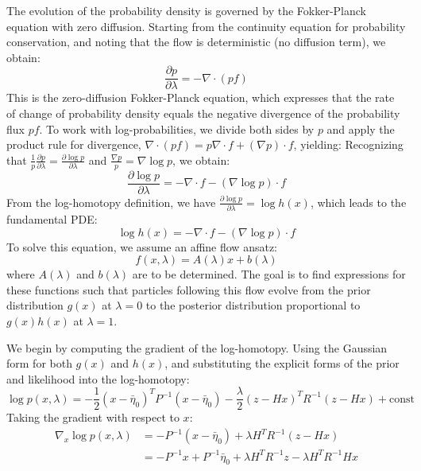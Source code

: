\documentclass{article}
\begin{document}
The evolution of the probability density is governed by the Fokker-Planck equation with zero diffusion. Starting from the continuity equation for probability conservation, and noting that the flow is deterministic (no diffusion term), we obtain:
\begin{equation}
\frac{\partial p}{\partial \lambda} = -\nabla \cdot (pf)
\end{equation}
This is the zero-diffusion Fokker-Planck equation, which expresses that the rate of change of probability density equals the negative divergence of the probability flux $pf$. To work with log-probabilities, we divide both sides by $p$ and apply the product rule for divergence, $\nabla \cdot (pf) = p\nabla \cdot f + (\nabla p) \cdot f$, yielding:
Recognizing that $\frac{1}{p}\frac{\partial p}{\partial \lambda} = \frac{\partial \log p}{\partial \lambda}$ and $\frac{\nabla p}{p} = \nabla \log p$, we obtain:
\begin{equation}
\frac{\partial \log p}{\partial \lambda} = -\nabla \cdot f - (\nabla \log p) \cdot f
\end{equation}
From the log-homotopy definition, we have $\frac{\partial \log p}{\partial \lambda} = \log h(x)$, which leads to the fundamental PDE:
\begin{equation}
\boxed{\log h(x) = -\nabla \cdot f - (\nabla \log p) \cdot f}
\end{equation}
To solve this equation, we assume an affine flow ansatz:
\begin{equation}
f(x,\lambda) = A(\lambda)x + b(\lambda)
\end{equation}
where $A(\lambda)$ and $b(\lambda)$ are to be determined. The goal is to find expressions for these functions such that particles following this flow evolve from the prior distribution $g(x)$ at $\lambda=0$ to the posterior distribution proportional to $g(x)h(x)$ at $\lambda=1$.

We begin by computing the gradient of the log-homotopy. Using the Gaussian form for both $g(x)$ and $h(x)$, and substituting the explicit forms of the prior and likelihood into the log-homotopy:
\begin{equation}
\log p(x,\lambda) = -\frac{1}{2}(x-\bar{\eta}_0)^T P^{-1}(x-\bar{\eta}_0) - \frac{\lambda}{2}(z-Hx)^T R^{-1}(z-Hx) + \text{const}
\end{equation}
Taking the gradient with respect to $x$:
\begin{align}
\nabla_x \log p(x,\lambda) &= -P^{-1}(x-\bar{\eta}_0) + \lambda H^T R^{-1}(z-Hx) \\
&= -P^{-1}x + P^{-1}\bar{\eta}_0 + \lambda H^T R^{-1}z - \lambda H^T R^{-1}Hx
\end{align}
\end{document}
